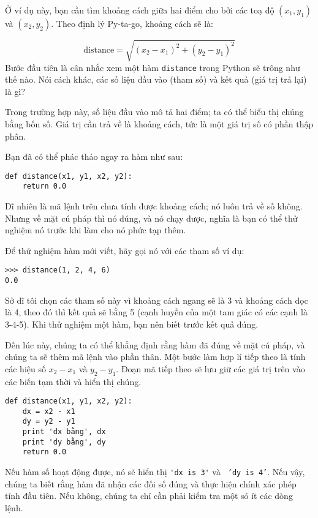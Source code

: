 \documentclass[11pt]{book}
\begin{document}

Ở ví dụ này, bạn cần tìm khoảng cách giữa hai điểm cho bởi các
toạ độ $(x_1, y_1)$ và $(x_2, y_2)$. Theo định lý Py-ta-go, khoảng
cách sẽ là:

\begin{displaymath}
\mathrm{distance} = \sqrt{(x_2 - x_1)^2 + (y_2 - y_1)^2}
\end{displaymath}
%
Bước đầu tiên là cân nhắc xem một hàm {\tt distance} trong Python
sẽ trông như thế nào. Nói cách khác, các số liệu đầu vào (tham số) và
kết quả (giá trị trả lại) là gì?

Trong trường hợp này, số liệu đầu vào mô tả hai điểm; ta có thể biểu 
thị chúng bằng bốn số. Giá trị cần trả về là khoảng cách, tức là một
giá trị số có phần thập phân.

Bạn đã có thể phác thảo ngay ra hàm như sau:

\beforeverb
\begin{verbatim}
def distance(x1, y1, x2, y2):
    return 0.0
\end{verbatim}
\afterverb
%
Dĩ nhiên là mã lệnh trên chưa tính được khoảng cách; nó luôn trả về
số không. Nhưng về mặt cú pháp thì nó đúng, và nó chạy được, nghĩa
là bạn có thể thử nghiệm nó trước khi làm cho nó phức tạp thêm.

Để thử nghiệm hàm mới viết, hãy gọi nó với các tham số ví dụ:

\beforeverb
\begin{verbatim}
>>> distance(1, 2, 4, 6)
0.0
\end{verbatim}
\afterverb
%
Sở dĩ tôi chọn các tham số này vì khoảng cách ngang sẽ là 3 và khoảng
cách dọc là 4, theo đó thì kết quả sẽ bằng 5 (cạnh huyền của một tam
giác có các cạnh là 3-4-5). Khi thử nghiệm một hàm, bạn nên biết trước
kết quả đúng.


Đến lúc này, chúng ta có thể khẳng định rằng hàm đã đúng về mặt
cú pháp, và chúng ta sẽ thêm mã lệnh vào phần thân. Một bước làm
hợp lí tiếp theo là tính các hiệu số $x_2 - x_1$ và $y_2 - y_1$.  
Đoạn mã tiếp theo sẽ lưu giữ các giá trị trên vào các biến tạm thời và
hiển thị chúng.

\beforeverb
\begin{verbatim}
def distance(x1, y1, x2, y2):
    dx = x2 - x1
    dy = y2 - y1
    print 'dx bằng', dx
    print 'dy bằng', dy
    return 0.0
\end{verbatim}
\afterverb
%
Nếu hàm số hoạt động được, nó sẽ hiển thị \verb"'dx is 3'" và {\tt
'dy is 4'}.  Nếu vậy, chúng ta biết rằng hàm đã nhận các đối số đúng
và thực hiện chính xác phép tính đầu tiên. Nếu không, chúng ta chỉ
cần phải kiểm tra một só ít các dòng lệnh.
\end{document}
